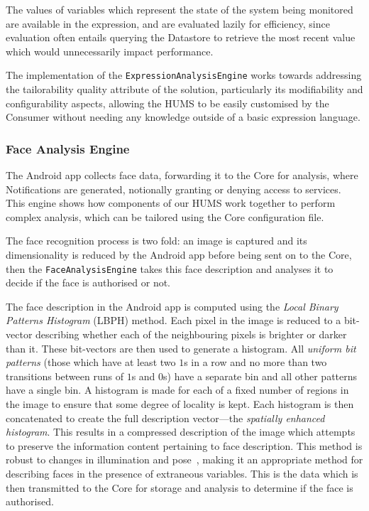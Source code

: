 \documentclass[10pt,a4paper]{article}
\begin{document}
The values of variables which represent the state of the system being monitored are available in the expression, and are evaluated lazily for efficiency, since evaluation often entails querying the Datastore to retrieve the most recent value which would unnecessarily impact performance.

The implementation of the \texttt{ExpressionAnalysisEngine} works towards addressing the tailorability quality attribute of the solution, particularly its modifiability and configurability aspects, allowing the HUMS to be easily customised by the Consumer without needing any knowledge outside of a basic expression language.

\subsubsection{Face Analysis Engine}
\label{sec:fae}

The Android app collects face data, forwarding it to the Core for analysis, where Notifications are generated, notionally granting or denying access to services. This engine shows how components of our HUMS work together to perform complex analysis, which can be tailored using the Core configuration file.

The face recognition process is two fold: an image is captured and its dimensionality is reduced by the Android app before being sent on to the Core, then the \texttt{FaceAnalysisEngine} takes this face description and analyses it to decide if the face is authorised or not.

The face description in the Android app is computed using the \emph{Local Binary Patterns Histogram} (LBPH) \cite{ahonen2006face} method. Each pixel in the image is reduced to a bit-vector describing whether each of the neighbouring pixels is brighter or darker than it. These bit-vectors are then used to generate a histogram. All \emph{uniform bit patterns} (those which have at least two $1$s in a row and no more than two transitions between runs of $1$s and $0$s) have a separate bin and all other patterns have a single bin. A histogram is made for each of a fixed number of regions in the image to ensure that some degree of locality is kept. Each histogram is then concatenated to create the full description vector---the \emph{spatially enhanced histogram}. This results in a compressed description of the image which attempts to preserve the information content pertaining to face description. This method is robust to changes in illumination and pose~\cite{ahonen2006face}, making it an appropriate method for describing faces in the presence of extraneous variables. This is the data which is then transmitted to the Core for storage and analysis to determine if the face is authorised.
\end{document}
